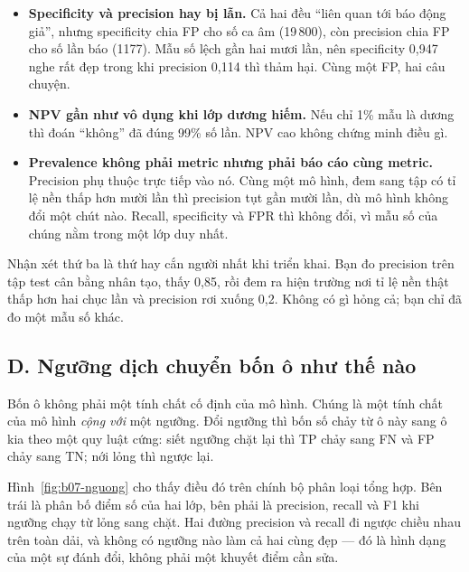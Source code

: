 \documentclass[../../deep_learning.tex]{subfiles}
\begin{document}
\begin{itemize}
\item \textbf{Specificity và precision hay bị lẫn.} Cả hai đều ``liên quan tới báo động giả'', nhưng specificity chia FP cho số ca âm (19\,800), còn precision chia FP cho số lần báo (1177). Mẫu số lệch gần hai mươi lần, nên specificity 0{,}947 nghe rất đẹp trong khi precision 0{,}114 thì thảm hại. Cùng một FP, hai câu chuyện.
\item \textbf{NPV gần như vô dụng khi lớp dương hiếm.} Nếu chỉ 1\% mẫu là dương thì đoán ``không'' đã đúng 99\% số lần. NPV cao không chứng minh điều gì.
\item \textbf{Prevalence không phải metric nhưng phải báo cáo cùng metric.} Precision phụ thuộc trực tiếp vào nó. Cùng một mô hình, đem sang tập có tỉ lệ nền thấp hơn mười lần thì precision tụt gần mười lần, dù mô hình không đổi một chút nào. Recall, specificity và FPR thì không đổi, vì mẫu số của chúng nằm trong một lớp duy nhất.
\end{itemize}

Nhận xét thứ ba là thứ hay cắn người nhất khi triển khai. Bạn đo precision trên tập test cân bằng nhân tạo, thấy 0{,}85, rồi đem ra hiện trường nơi tỉ lệ nền thật thấp hơn hai chục lần và precision rơi xuống 0{,}2. Không có gì hỏng cả; bạn chỉ đã đo một mẫu số khác.

\subsection{D. Ngưỡng dịch chuyển bốn ô như thế nào}
Bốn ô không phải một tính chất cố định của mô hình. Chúng là một tính chất của mô hình \emph{cộng với} một ngưỡng. Đổi ngưỡng thì bốn số chảy từ ô này sang ô kia theo một quy luật cứng: siết ngưỡng chặt lại thì TP chảy sang FN và FP chảy sang TN; nới lỏng thì ngược lại.

Hình~\ref{fig:b07-nguong} cho thấy điều đó trên chính bộ phân loại tổng hợp. Bên trái là phân bố điểm số của hai lớp, bên phải là precision, recall và F1 khi ngưỡng chạy từ lỏng sang chặt. Hai đường precision và recall đi ngược chiều nhau trên toàn dải, và không có ngưỡng nào làm cả hai cùng đẹp --- đó là hình dạng của một sự đánh đổi, không phải một khuyết điểm cần sửa.
\end{document}
